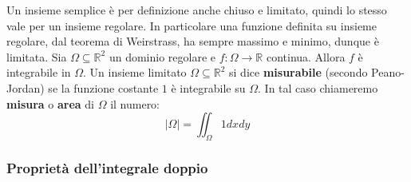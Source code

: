 \documentclass[a4paper]{article}
\numberwithin{equation}{subsection}
\begin{document}
\noindent
Un insieme semplice è per definizione anche chiuso e limitato, quindi lo stesso vale per un insieme regolare.
In particolare una funzione definita su insieme regolare, dal teorema di Weirstrass, ha sempre massimo e minimo, dunque è limitata.
\thm{}
{
    Sia $\Omega \subseteq \mathbb{R}^2$ un dominio regolare e $f : \Omega \rightarrow \mathbb{R}$ continua.
    Allora $f$ è integrabile in $\Omega$.
}
{
    Un insieme limitato $\Omega \subseteq \mathbb{R}^2$ si dice \textbf{misurabile} (secondo Peano-Jordan) 
    se la funzione costante $1$ è integrabile su $\Omega$.
    In tal caso chiameremo \textbf{misura} o \textbf{area} di $\Omega$ il numero:
    \[|\Omega| = \iint_\Omega 1 dxdy\]
}

\subsubsection{Proprietà dell'integrale doppio}
\end{document}
